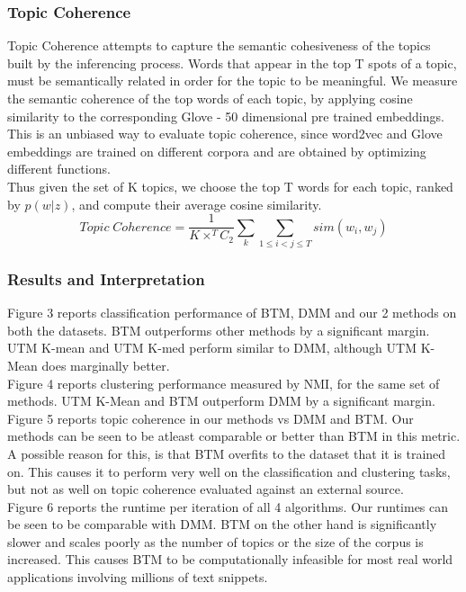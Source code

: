\documentclass{sig-alternate-05-2015}
\begin{document}
\subsubsection{Topic Coherence}
Topic Coherence attempts to capture the semantic cohesiveness of the topics built by the inferencing process. Words that appear in the top T spots of a topic, must be semantically related in order for the topic to be meaningful. We measure the semantic coherence of the top words of each topic, by applying cosine similarity to the corresponding Glove - 50 dimensional pre trained embeddings. This is an unbiased way to evaluate topic coherence, since word2vec and Glove embeddings are trained on different corpora and are obtained by optimizing different functions.
\\
Thus given the set of K topics, we choose the top T words for each topic, ranked by $p(w|z)$, and compute their average cosine similarity.
$$Topic \;Coherence = \frac{1}{K \times ^{T}C_{2}}\sum_{k}\sum_{1 \leq i < j \leq T}sim(w_{i}, w_{j})$$

\subsubsection{Results and Interpretation}


Figure 3 reports classification performance of BTM, DMM and our 2 methods on both the datasets. BTM outperforms other methods by a significant margin. UTM K-mean and UTM K-med perform similar to DMM, although UTM K-Mean does marginally better.
\\[5pt]
Figure 4 reports clustering performance measured by NMI, for the same set of methods. UTM K-Mean and BTM outperform DMM by a significant margin.
\\[5pt]
Figure 5 reports topic coherence in our methods vs DMM and BTM. Our methods can be seen to be atleast comparable or better than BTM in this metric. A possible reason for this, is that BTM overfits to the dataset that it is trained on. This causes it to perform very well on the classification and clustering tasks, but not as well on topic coherence evaluated against an external source. 
\\[5pt]
Figure 6 reports the runtime per iteration of all 4 algorithms. Our runtimes can be seen to be comparable with DMM. BTM on the other hand is significantly slower and scales poorly as the number of topics or the size of the corpus is increased. This causes BTM to be computationally infeasible for most real world applications involving millions of text snippets. 
\end{document}
